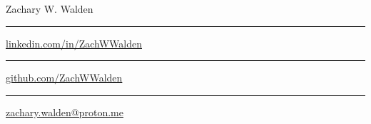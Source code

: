 \documentclass{article}
\newcommand\mybar{\kern1pt\rule[-\dp\strutbox]{.8pt}{\baselineskip}\kern1pt}
\begin{document}
\begin{center}
	\begin{huge}
		Zachary W. Walden\\
	\end{huge}
	\begin{large}
	\end{large}
	\begin{normalsize}
		 \mybar { } \faLinkedin \href{https://linkedin.com/in/ZachWWalden}{ linkedin.com/in/ZachWWalden} \mybar { } \faGithub \href{https://github.com/ZachWWalden}{ github.com/ZachWWalden}
		\mybar { }\faEnvelope\href{mailto::zachary.walden@proton.me}{ zachary.walden@proton.me}
	\end{normalsize}
\end{center}
\end{document}
